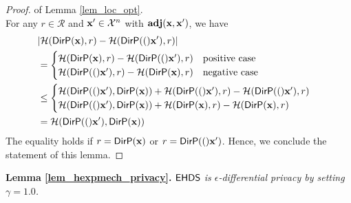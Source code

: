 \documentclass{article}
\begin{document}
\begin{proof} of Lemma \ref{lem_loc_opt}.\\
For any $r \in \mathcal{R}$ and $\textbf{x}' \in \mathcal{X}^n$ with $\textbf{adj}(\textbf{x},\textbf{x}')$, we have
\begin{align*}
&\lvert \mathcal{H}(\mathsf{DirP}(\textbf{x}), r) - \mathcal{H}(\mathsf{DirP}(()\textbf{x}'), r)\rvert\\
& = 
\begin{cases}
\mathcal{H}(\mathsf{DirP}(\textbf{x}), r) - \mathcal{H}(\mathsf{DirP}(()\textbf{x}'),r) & \text{positive case}\\
\mathcal{H}(\mathsf{DirP}(()\textbf{x}'),r) - \mathcal{H}(\mathsf{DirP}(\textbf{x}), r) & \text{negative case}
\end{cases}\\
& \leq 
\begin{cases}
\mathcal{H}(\mathsf{DirP}(()\textbf{x}'), \mathsf{DirP}(\textbf{x}))+
\mathcal{H}(\mathsf{DirP}(()\textbf{x}'), r) - \mathcal{H}(\mathsf{DirP}(()\textbf{x}'),r) & \\
\mathcal{H}(\mathsf{DirP}(()\textbf{x}'), \mathsf{DirP}(\textbf{x}))+
\mathcal{H}(\mathsf{DirP}(\textbf{x}), r) - \mathcal{H}(\mathsf{DirP}(\textbf{x}), r)&
\end{cases}\\
&= \mathcal{H}(\mathsf{DirP}(()\textbf{x}'), \mathsf{DirP}(\textbf{x}))
\end{align*}
The equality holds if $r = \mathsf{DirP}(\textbf{x})$ or $r = \mathsf{DirP}(()\textbf{x}')$.
Hence, we conclude the statement of this lemma.
\end{proof}



\noindent \textbf{ Lemma \ref{lem_hexpmech_privacy}. } 
\emph{
$\mathsf{EHDS}$ is $\epsilon$-differential privacy by setting $\gamma = 1.0$.
}
\end{document}
